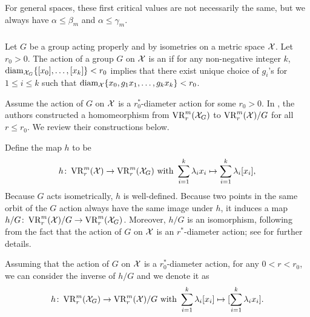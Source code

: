 \medskip\remark
For general spaces, these first critical values are not necessarily the same, but we always have $\alpha \leq \beta_m$ and $\alpha \leq \gamma_m$.


\subsubsection{}


Let $G$ be a group acting properly and by isometries on a metric space $\mathcal{X}$.
Let $r_0>0$. The action of a group $G$ on $\mathcal{X}$ is an  if for any non-negative integer $k$, $\operatorname{diam}_{\mathcal{X}_G}\{[x_0],\dots,[x_k]\}<r_0$ implies that there exist unique choice of $g_i$'s for $1\leq i\leq k$ such that $\operatorname{diam}_{\mathcal{X}}\{x_0,g_1x_1,\dots,g_kx_k\}<r_0$. 

Assume the action of $G$ on $\mathcal{X}$ is a $r_0^*$-diameter action for some $r_0> 0$.
In \cite[Proposition 3.5]{adams2022metric}, the authors constructed a homomeorphism from $\operatorname{VR}_r^m(\mathcal{X}_G)$ to $\operatorname{VR}_r^m(\mathcal{X})/G$ for all $r \leq r_0$.
We review their constructions below. 

Define the map $h$ to be
\[
h \colon \operatorname{VR}_r^m(\mathcal{X}) \to \operatorname{VR}_r^m(\mathcal{X}_G) 
\text{ with }
\sum_{i=1}^k \lambda_i x_i \mapsto \sum_{i=1}^k \lambda_i [x_i],
\]
Because $G$ acts isometrically, $h$ is well-defined.
Because two points in the same orbit of the $G$ action always have the same image under $h$, it induces a map $h/G \colon \operatorname{VR}_r^m(\mathcal{X})/G \to \operatorname{VR}_r^m(\mathcal{X}_G)$.
Moreover, $h/G$ is an isomorphism, following from the fact that the action of $G$ on $\mathcal{X}$ is an $r^*$-diameter action; see \cite[Proposition 3.5]{adams2022metric} for further details.

Assuming that the action of $G$ on $\mathcal{X}$ is a $r_0^*$-diameter action, for any $0<r<r_0$, we can consider the inverse of $h/G$ and we denote it as
\[
h \colon \operatorname{VR}_r^m(\mathcal{X}_G) \to \operatorname{VR}_r^m(\mathcal{X})/G
\text{ with }
\sum_{i=1}^k \lambda_i [x_i] \mapsto [\sum_{i=1}^k \lambda_i x_i].
\]


\subsubsection{}

